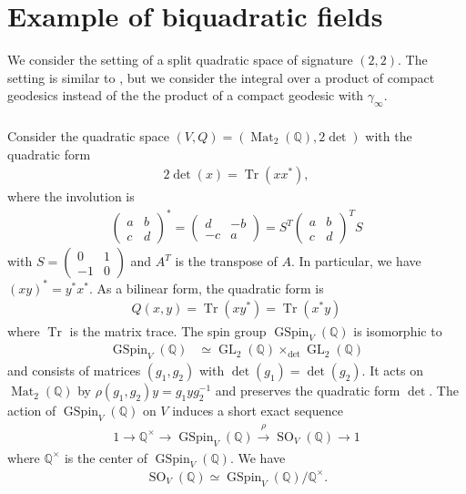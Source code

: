 \documentclass[11pt]{article} %
\newcommand{\8}{\infty}
\newcommand{\GSpin}{\operatorname{GSpin}}
\newcommand{\SO}{\operatorname{SO}}
\newcommand{\GL}{\operatorname{GL}}
\newcommand{\Q}{\mathbb{Q}}
\newcommand{\Tr}{\operatorname{Tr}}
\newcommand{\Mat}{\operatorname{Mat}}
\theoremstyle{mytheoremstyle}
\theoremstyle{remark}
\numberwithin{equation}{section}
\begin{document}
\section{Example of biquadratic fields} \label{lowrank}
We consider the setting of a split quadratic space of signature $(2,2)$. The setting is similar to \cite{rbrforum}, but we consider the integral over a product of compact geodesics instead of the the product of a compact geodesic with $\gamma_\8$.

\subsubsection{} Consider the quadratic space $(V,Q)=(\Mat_2(\Q),2\det)$ with the quadratic form \begin{align}
2\det(x)=\Tr(xx^*), \end{align}
where the involution is
\begin{align} \label{involutiont}
    \begin{pmatrix}
        a & b \\ c & d
    \end{pmatrix}^*=\begin{pmatrix}
        d & -b \\ -c & a
    \end{pmatrix}=S^T\begin{pmatrix}
        a & b \\ c & d
    \end{pmatrix}^TS
\end{align}
with $S=\begin{pmatrix}
        0 & 1 \\ -1 & 0
    \end{pmatrix}$ and $A^T$ is the transpose of $A$. In particular, we have $(xy)^*=y^*x^*$. As a bilinear form, the quadratic form is
    \begin{align}
        Q(x,y)=\Tr(xy^\ast)=\Tr(x^\ast y)
    \end{align}
    where $\Tr$ is the matrix trace. The spin group $\GSpin_V(\Q)$ is isomorphic to
\begin{align}
    \GSpin_V(\Q) & \simeq \GL_2(\Q) \times_{\det} \GL_2(\Q)
\end{align}
and consists of matrices $(g_1,g_2)$ with $\det(g_1)=\det(g_2)$. It acts on $\Mat_2(\Q)$ by $\rho(g_1, g_2)y=g_1yg_2^{-1}$ and preserves the quadratic form $\det$. The action of $\GSpin_V(\Q)$ on $V$ induces a short exact sequence
\begin{align}  
     1 \xrightarrow{\ \  \  \ \  } \Q^\times \xrightarrow{\ \  \  \ \  } \GSpin_V(\Q) \xrightarrow{\ \  \rho \ \  } \SO_V(\Q) \xrightarrow{\ \  \ \ \  } 1
\end{align}
where $\Q^\times$ is the center of $\GSpin_V(\Q)$. We have \begin{align}\SO_V(\Q) \simeq \GSpin_V(\Q)/\Q^\times.\end{align}
\end{document}
